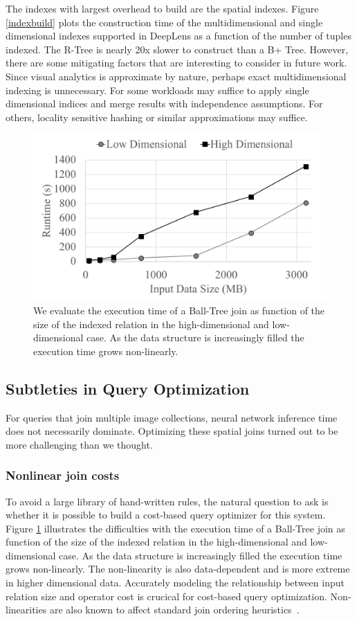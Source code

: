 The indexes with largest overhead to build are the spatial indexes.
Figure \ref{indexbuild} plots the construction time of the multidimensional and single dimensional indexes supported in \textsf{DeepLens} as a function of the number of tuples indexed.
The R-Tree is nearly 20x slower to construct than a B+ Tree.
However, there are some mitigating factors that are interesting to consider in future work.
Since visual analytics is approximate by nature, perhaps exact multidimensional indexing is unnecessary. 
For some workloads may suffice to apply single dimensional indices and merge results with independence assumptions.
For others, locality sensitive hashing or similar approximations may suffice.

\begin{figure}[t]
\centering
 \includegraphics[width=0.8\columnwidth]{figures/spatialjoin.png}
 \caption{We evaluate the execution time of a Ball-Tree join as function of the size of the indexed relation in the high-dimensional and low-dimensional case. As the data structure is increasingly filled the execution time grows non-linearly. \label{join} }
\end{figure}


\subsection{Subtleties in Query Optimization}
For queries that join multiple image collections, neural network inference time does not necessarily dominate.
Optimizing these spatial joins turned out to be more challenging than we thought.

\subsubsection{Nonlinear join costs}
To avoid a large library of hand-written rules, the natural question to ask is whether it is possible to build a cost-based query optimizer for this system.
Figure \ref{join} illustrates the difficulties with the execution time of a Ball-Tree join as function of the size of the indexed relation in the high-dimensional and low-dimensional case. As the data structure is increasingly filled the execution time grows non-linearly. The non-linearity is also data-dependent and is more extreme in higher dimensional data. Accurately modeling the relationship between input relation size and operator cost is crucical for cost-based query optimization. Non-linearities are also known to affect standard join ordering heuristics~\cite{krishnan2018deeprljoins}.

